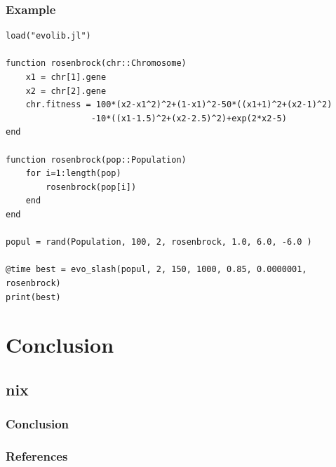 \documentclass[%
14pt
]{beamer}
\begin{document}
\begin{frame}[fragile]
  \frametitle{Example}
  \vspace{-0.5cm}
{\scriptsize
\begin{verbatim}
load("evolib.jl")

function rosenbrock(chr::Chromosome)
    x1 = chr[1].gene
    x2 = chr[2].gene
    chr.fitness = 100*(x2-x1^2)^2+(1-x1)^2-50*((x1+1)^2+(x2-1)^2)
                 -10*((x1-1.5)^2+(x2-2.5)^2)+exp(2*x2-5)
end

function rosenbrock(pop::Population)
    for i=1:length(pop)
        rosenbrock(pop[i])
    end
end

popul = rand(Population, 100, 2, rosenbrock, 1.0, 6.0, -6.0 )

@time best = evo_slash(popul, 2, 150, 1000, 0.85, 0.0000001, rosenbrock)
print(best)

\end{verbatim}}
\end{frame}







\section{Conclusion}
\subsection{nix}
\begin{frame}
  \frametitle{Conclusion}
\end{frame}

\begin{frame}

\frametitle{References}
% 
 \small
 {}
 
\end{frame}

\end{document}
